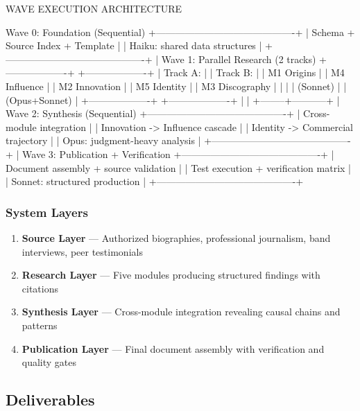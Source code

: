 \documentclass[11pt,letterpaper]{article}
\begin{document}
\begin{asciibox}
WAVE EXECUTION ARCHITECTURE

  Wave 0: Foundation (Sequential)
  +-------------------------------------------+
  | Schema + Source Index + Template           |
  | Haiku: shared data structures              |
  +-------------------------------------------+
              |
  Wave 1: Parallel Research (2 tracks)
  +-------------------+  +-------------------+
  | Track A:          |  | Track B:          |
  | M1 Origins        |  | M4 Influence      |
  | M2 Innovation     |  | M5 Identity       |
  | M3 Discography    |  |                   |
  | (Sonnet)          |  | (Opus+Sonnet)     |
  +-------------------+  +-------------------+
              |                    |
              +--------+-----------+
                       |
  Wave 2: Synthesis (Sequential)
  +-------------------------------------------+
  | Cross-module integration                   |
  | Innovation -> Influence cascade            |
  | Identity -> Commercial trajectory          |
  | Opus: judgment-heavy analysis              |
  +-------------------------------------------+
              |
  Wave 3: Publication + Verification
  +-------------------------------------------+
  | Document assembly + source validation      |
  | Test execution + verification matrix       |
  | Sonnet: structured production              |
  +-------------------------------------------+
\end{asciibox}

\subsubsection{System Layers}

\begin{enumerate}[leftmargin=2em]
\item \textbf{Source Layer} --- Authorized biographies, professional journalism, band interviews, peer testimonials
\item \textbf{Research Layer} --- Five modules producing structured findings with citations
\item \textbf{Synthesis Layer} --- Cross-module integration revealing causal chains and patterns
\item \textbf{Publication Layer} --- Final document assembly with verification and quality gates
\end{enumerate}

\subsection{Deliverables}
\end{document}
